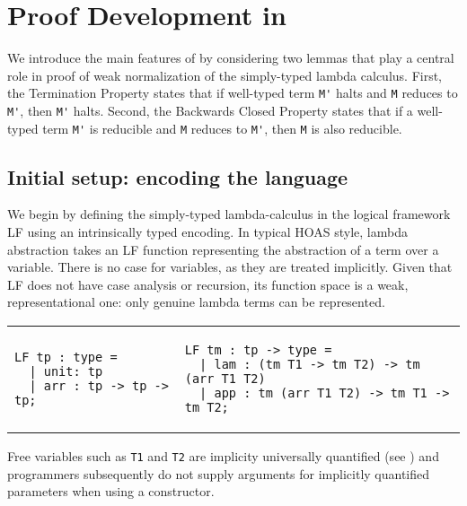 \chapter{Proof Development in \Harpoon}
\sloppy %
\label{chap:example}

We introduce the main features of \Harpoon{} by considering two
lemmas that play a central role in proof of weak normalization of
the simply-typed lambda calculus.
First, the Termination Property states that if
well-typed term \lstinline!M'! halts and \lstinline!M!
reduces to \lstinline!M'!, then \lstinline!M'! halts.
Second, the Backwards Closed Property states that if a well-typed term
\lstinline!M'! is reducible and \lstinline!M! reduces to \lstinline!M'!, then
\lstinline!M! is also reducible.

\section{Initial setup: encoding the language}
\label{sec:setup-1}
We begin by defining the simply-typed lambda-calculus in the logical
framework LF \cite{Harper93jacm} using an intrinsically typed
encoding.
In typical HOAS style, lambda abstraction takes an LF function representing the
abstraction of a term over a variable. There is no case for variables, as they
are treated implicitly.
Given that LF does not have case analysis or recursion, its function space is a
weak, representational one: only genuine lambda terms can be represented.
%
\begin{center}
\begin{tabular}{ll}
\begin{lstlisting}
LF tp : type =
  | unit: tp
  | arr : tp -> tp -> tp;
\end{lstlisting}
  &
\begin{lstlisting}
LF tm : tp -> type =
  | lam : (tm T1 -> tm T2) -> tm (arr T1 T2)
  | app : tm (arr T1 T2) -> tm T1 -> tm T2;
\end{lstlisting}
\end{tabular}
\end{center}
%
Free variables such as \lstinline!T1! and \lstinline!T2! are
implicity universally quantified (see \cite{Pientka:JFP13})
and programmers subsequently do not supply arguments for
implicitly quantified parameters when using a constructor.




